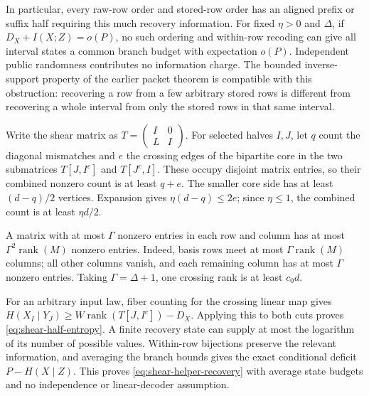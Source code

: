 In particular, every raw-row order and stored-row order has an aligned prefix
or suffix half requiring this much recovery information. For fixed $\eta>0$ and $\Delta$, if
$D_X+I(X;Z)=o(P)$, no such ordering and within-row recoding can give all
interval states a common branch budget with expectation $o(P)$.
Independent public randomness contributes no information charge.
The bounded inverse-support property of the earlier
packet theorem is compatible with this obstruction: recovering a row from a
few arbitrary stored rows is different from recovering a whole interval from
only the stored rows in that same interval.

\begin{proofoutline}
Write the shear matrix as $T=\begin{pmatrix}I&0\\ L&I\end{pmatrix}$.
For selected halves $I,J$, let $q$ count the diagonal mismatches and $e$ the
crossing edges of the bipartite core in the two submatrices
$T[J,I^c]$ and $T[J^c,I]$. These occupy disjoint matrix entries, so their
combined nonzero count is at least $q+e$. The smaller core side has at least
$(d-q)/2$ vertices. Expansion gives $\eta(d-q)\le2e$; since $\eta\le1$,
the combined count is at least $\eta d/2$.

A matrix with at most $\Gamma$ nonzero entries in each row and column has
at most $\Gamma^2\operatorname{rank}(M)$ nonzero entries. Indeed, basis rows
meet at most $\Gamma\operatorname{rank}(M)$ columns; all other columns vanish,
and each remaining column has at most $\Gamma$ nonzero entries. Taking
$\Gamma=\Delta+1$, one crossing rank is at least $c_0d$.

For an arbitrary input law, fiber counting for the crossing linear map gives
$H(X_I\mid Y_J)\ge W\operatorname{rank}(T[J,I^c])-D_X$.
Applying this to both cuts proves \eqref{eq:shear-half-entropy}.
A finite recovery state can supply at most the logarithm of its number of
possible values. Within-row bijections preserve the relevant information,
and averaging the branch bounds gives the exact conditional deficit
$P-H(X\mid Z)$. This proves \eqref{eq:shear-helper-recovery} with average
state budgets and no independence or linear-decoder assumption.
\end{proofoutline}

